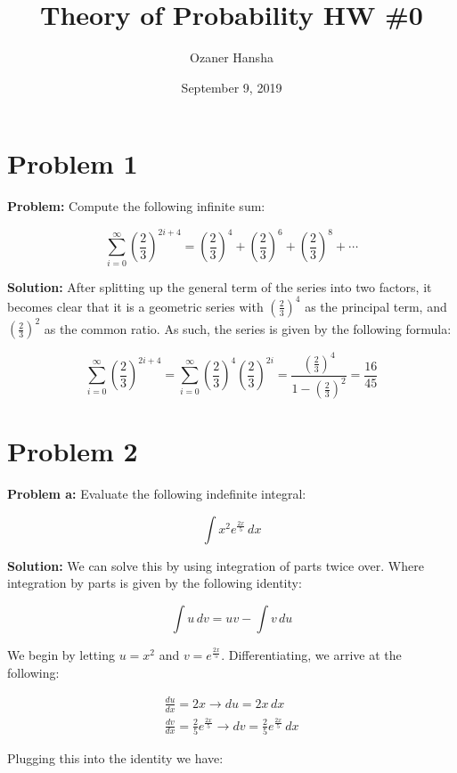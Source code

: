 \documentclass{article}
\begin{document}
\title{Theory of Probability HW \#0}
\author{Ozaner Hansha}
\date{September 9, 2019}
\maketitle

\newcommand*\Eval[3]{\left[#1\right]_{#2}^{#3}}

\section*{Problem 1}
\noindent\textbf{Problem:} Compute the following infinite sum:

$$\sum_{i=0}^\infty\left(\frac{2}{3}\right)^{2i+4}=\left(\frac{2}{3}\right)^4+\left(\frac{2}{3}\right)^6+\left(\frac{2}{3}\right)^8+\cdots$$

\noindent\textbf{Solution:} After splitting up the general term of the series into two factors, it becomes clear that it is a geometric series with $\left(\frac{2}{3}\right)^4$ as the principal term, and $\left(\frac{2}{3}\right)^2$ as the common ratio. As such, the series is given by the following formula:

$$\sum_{i=0}^\infty\left(\frac{2}{3}\right)^{2i+4}=\sum_{i=0}^\infty\left(\frac{2}{3}\right)^4\left(\frac{2}{3}\right)^{2i}=\frac{\left(\frac{2}{3}\right)^4}{1-\left(\frac{2}{3}\right)^2}=\frac{16}{45}$$

\section*{Problem 2}
\noindent\textbf{Problem a:} Evaluate the following indefinite integral:

$$\int x^2e^{\frac{2x}{5}}\, dx$$

\noindent\textbf{Solution:} We can solve this by using integration of parts twice over. Where integration by parts is given by the following identity:

$$\int u\,dv=uv-\int v\,du$$

We begin by letting $u=x^2$ and $v=e^{\frac{2x}{5}}$. Differentiating, we arrive at the following:

\begin{gather*}
    \frac{du}{dx}=2x\rightarrow du=2x\,dx\\
    \frac{dv}{dx}=\frac{2}{5}e^{\frac{2x}{5}}\rightarrow dv=\frac{2}{5}e^{\frac{2x}{5}}\,dx
\end{gather*}

Plugging this into the identity we have:
\end{document}
